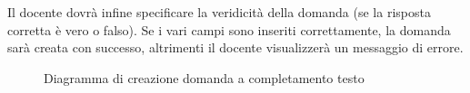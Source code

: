 \documentclass[a4paper, titlepage]{article}
\begin{document}
Il docente dovrà infine specificare la veridicità della domanda (se la risposta corretta è vero o falso). 
Se i vari campi sono inseriti correttamente, la domanda sarà creata con successo, altrimenti il docente visualizzerà un messaggio di errore.

\newpage
{}
\begin{figure}[H]
	\centering
	\noindent{}
	\caption{Diagramma di creazione domanda a completamento testo}
\end{figure}
\end{document}
